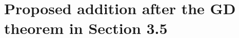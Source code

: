 \documentclass[10pt,letterpaper]{article}
\begin{document}
\section*{Proposed addition after the GD theorem in Section 3.5}

\clearpage
\appendix
{}

\end{document}
